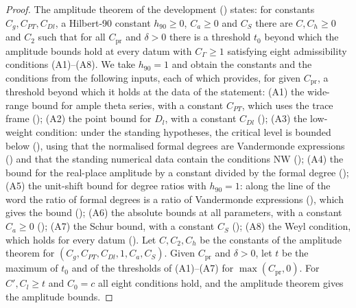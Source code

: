 \begin{proof}
The amplitude theorem of the development () states: for constants
$C_g,C_{PT},C_{Dl}$, a Hilbert-90 constant $h_{90}\ge0$, $C_a\ge0$ and $C_S$ there are $C,C_h\ge0$ and $C_2$ such that for all $C_{\mathrm{pr}}$
and $\delta>0$ there is a threshold $t_0$ beyond which the amplitude bounds hold at every datum with $C_\Gamma\ge1$ satisfying eight
admissibility conditions (A1)--(A8). We take $h_{90}=1$ and obtain the constants and the conditions from the following inputs, each of
which provides, for given $C_{\mathrm{pr}}$, a threshold beyond which it holds at the data of the statement:
(A1) the wide-range bound for ample theta series, with a constant $C_{PT}$, which uses the trace frame
();
(A2) the point bound for $D_l$, with a constant $C_{Dl}$ ();
(A3) the low-weight condition: under the standing hypotheses, the critical level is bounded below
(), using that the normalised formal degrees are Vandermonde
expressions () and that the standing numerical data contain the
conditions $\mathrm{NW}$ ();
(A4) the bound for the real-place amplitude by a constant divided by the formal degree
();
(A5) the unit-shift bound for degree ratios with $h_{90}=1$: along the line of the word the ratio of formal degrees is a ratio of
Vandermonde expressions (), which gives the bound
();
(A6) the absolute bounds at all parameters, with a constant $C_a\ge0$ ();
(A7) the Schur bound, with a constant $C_S$ ();
(A8) the Weyl condition, which holds for every datum ().
Let $C,C_2,C_h$ be the constants of the amplitude theorem for $(C_g,C_{PT},C_{Dl},1,C_a,C_S)$. Given $C_{\mathrm{pr}}$ and $\delta>0$, let $t$ be
the maximum of $t_0$ and of the thresholds of (A1)--(A7) for $\max(C_{\mathrm{pr}},0)$. For $C',C_l\ge t$ and $C_0=c$ all eight conditions hold,
and the amplitude theorem gives the amplitude bounds.
\end{proof}

